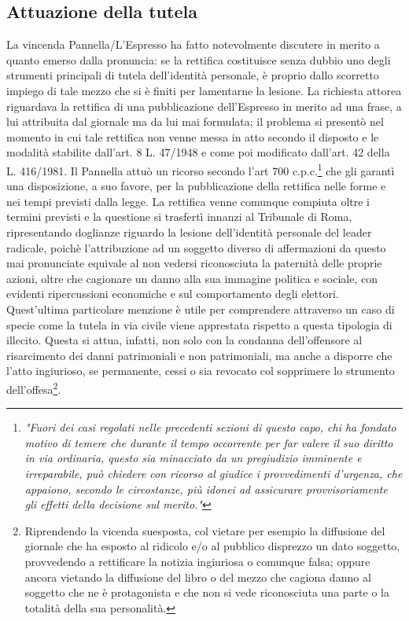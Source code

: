 \subsection{Attuazione della tutela}
La vincenda Pannella/L'Espresso ha fatto notevolmente discutere in merito a quanto emerso dalla pronuncia: se la rettifica costituisce senza dubbio uno degli strumenti principali di tutela dell'identità personale, è proprio dallo scorretto impiego di tale mezzo che si è finiti per lamentarne la lesione.
La richiesta attorea riguardava la rettifica di una pubblicazione dell'Espresso in merito ad una frase, a lui attribuita dal giornale ma da lui mai formulata; il problema si presentò nel momento in cui tale rettifica non venne messa in atto secondo il disposto e le modalità stabilite dall'art. 8 L. 47/1948 e come poi modificato dall'art. 42 della L. 416/1981. Il Pannella attuò un ricorso secondo l'art 700 c.p.c.\footnote{\textit{"Fuori dei casi regolati nelle precedenti sezioni di questo capo, chi ha fondato motivo di temere che durante il tempo occorrente per far valere il suo diritto in via ordinaria, questo sia minacciato da un pregiudizio imminente e irreparabile, può chiedere con ricorso al giudice i provvedimenti d'urgenza, che appaiono, secondo le circostanze, più idonei ad assicurare provvisoriamente gli effetti della decisione sul merito."}} che gli garantì una disposizione, a suo favore, per la pubblicazione della rettifica nelle forme e nei tempi previsti dalla legge.
La rettifica venne comunque compiuta oltre i termini previsti e la questione si trasfertì innanzi al Tribunale di Roma, ripresentando doglianze riguardo la lesione dell'identità personale del leader radicale, poichè l'attribuzione ad un soggetto diverso di affermazioni da questo mai pronunciate equivale al non vedersi riconosciuta la paternità delle proprie azioni, oltre che cagionare un danno alla sua immagine politica e sociale, con evidenti ripercussioni economiche e sul comportamento degli elettori.
Quest'ultima particolare menzione è utile per comprendere attraverso un caso di specie come la tutela in via civile viene apprestata rispetto a questa tipologia di illecito.
Questa si attua, infatti, non solo con la condanna dell’offensore al risarcimento dei danni patrimoniali e non patrimoniali, ma anche a disporre che l’atto ingiurioso, se permanente, cessi o sia revocato col sopprimere lo strumento dell’offesa\footnote{Riprendendo la vicenda suesposta, col vietare per esempio la diffusione del giornale che ha esposto al ridicolo e/o al pubblico disprezzo un dato soggetto, provvedendo a rettificare la notizia ingiuriosa o comunque falsa; oppure ancora vietando la diffusione del libro o del mezzo che cagiona danno al soggetto che ne è protagonista e che non si vede riconosciuta una parte o la totalità della sua personalità.}.

